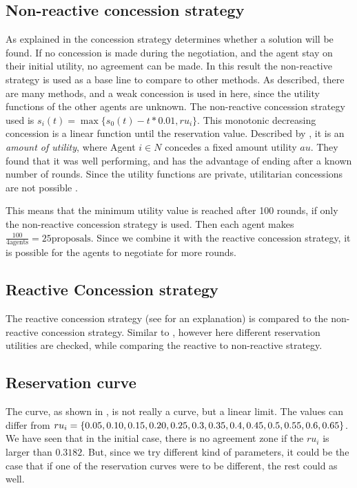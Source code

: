 \subsection{Non-reactive concession strategy}
As explained in  the concession strategy determines whether a solution will be found. If no concession is made during the negotiation, and the agent stay on their initial utility, no agreement can be made. In this result the non-reactive strategy is used as a base line to compare to other methods. As described, there are many methods, and a weak concession is used in here, since the utility functions of the other agents are unknown. The non-reactive concession strategy used is $s_i(t) = \max \{s_0(t) - t * 0.01, ru_i\}$. This monotonic decreasing concession is a linear function until the reservation value. Described by \cite{wu2009efficient}, it is an \textit{amount of utility}, where Agent $ i \in N$ concedes a fixed amount utility $au$. They found that it was well performing, and has the advantage of ending after a known number of rounds. Since the utility functions are private, utilitarian concessions are not possible \citep{endriss2006monotonic}. 

This means that the minimum utility value is reached after 100 rounds, if only the non-reactive concession strategy is used. Then each agent makes $\frac{100}{4 \text{agents}} = 25 \text{proposals}$. Since we combine it with the reactive concession strategy, it is possible for the agents to negotiate for more rounds.

\subsection{Reactive Concession strategy}
The reactive concession strategy (see  for an explanation) is compared to the non-reactive concession strategy. Similar to \citet{zheng2015automated}, however here different reservation utilities are checked, while comparing the reactive to non-reactive strategy.

\subsection{Reservation curve}
The curve, as shown in , is not really a curve, but a linear limit. The values can differ from 	
$ru_i = \{0.05, 0.10, 0.15, 0.20, 0.25, 0.3, 0.35, 0.4, 0.45, 0.5, \\0.55, 0.6, 0.65\}$. We have seen that in the initial case, there is no agreement zone if the $ru_i$ is larger than $0.3182$. But, since we try different kind of parameters, it could be the case that if one of the reservation curves were to be different, the rest could as well. 

